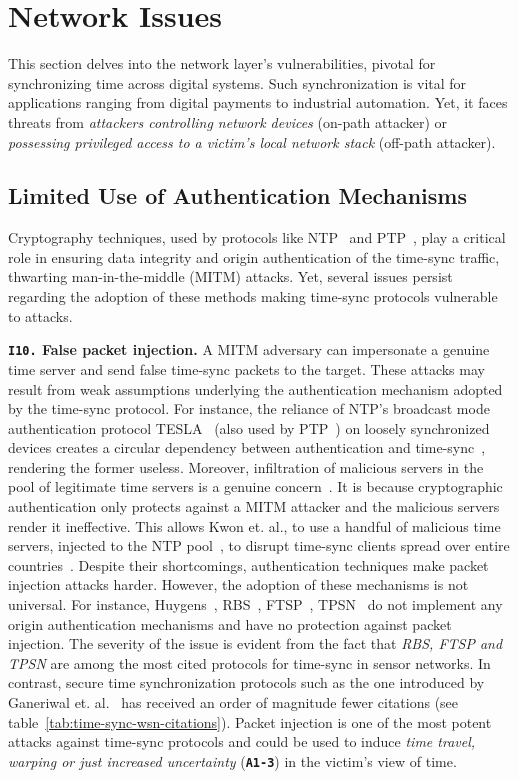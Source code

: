 \section{Network Issues} \label{sec:network-issues}
This section delves into the network layer's vulnerabilities, pivotal for synchronizing time across digital systems. Such synchronization is vital for applications ranging from digital payments to industrial automation. Yet, it faces threats from \textit{attackers controlling network devices} (on-path attacker) or \textit{possessing privileged access to a victim's local network stack} (off-path attacker).

\subsection{Limited Use of Authentication Mechanisms} Cryptography techniques, used by protocols like NTP~\cite{ntpv4-rfc} and PTP~\cite{ptp-std-doc}, play a critical role in ensuring data integrity and origin authentication of the time-sync traffic, thwarting man-in-the-middle (MITM) attacks. Yet, several issues persist regarding the adoption of these methods making time-sync protocols vulnerable to attacks.


\noindent\textbf{\texttt{I10.} False packet injection.} A MITM adversary can impersonate a genuine time server and send false time-sync packets to the target. These attacks may result from weak assumptions underlying the authentication mechanism adopted by the time-sync protocol. For instance, the reliance of NTP's broadcast mode authentication protocol TESLA~\cite{tesla-cryptography} (also used by PTP~\cite{ptp-std-doc}) on loosely synchronized devices creates a circular dependency between authentication and time-sync~\cite{ntp-replay-drop-attack}, rendering the former useless. Moreover, infiltration of malicious servers in the pool of legitimate time servers is  a genuine concern~\cite{shark-ntp-pool, devil-time-origin}. It is because cryptographic authentication only protects against a MITM attacker and the malicious servers render it ineffective. This allows Kwon et. al., to use a handful of malicious time servers, injected to the NTP pool~\cite{ntpd-pool-project}, to disrupt time-sync clients spread over entire countries~\cite{shark-ntp-pool}. Despite their shortcomings, authentication techniques make packet injection attacks harder. However, the adoption of these mechanisms is not universal. For instance, Huygens~\cite{huygens}, RBS~\cite{Elson2003RBS}, FTSP~\cite{ftsp-2004}, TPSN~\cite{tpsn-2003} do not implement any origin authentication mechanisms and have no protection against packet injection. The severity of the issue is evident from the fact that \textit{RBS, FTSP and TPSN} are among the most cited protocols for time-sync in sensor networks. In contrast, secure time synchronization protocols such as the one introduced by Ganeriwal et. al.~\cite{net-sync-wsn-sec-prot} has received an order of magnitude fewer citations (see table~\ref{tab:time-sync-wsn-citations}). Packet injection is one of the most potent attacks against time-sync protocols and could be used to induce \textit{time travel, warping or just increased uncertainty} (\textbf{\texttt{A1-3}}) in the victim's view of time.

